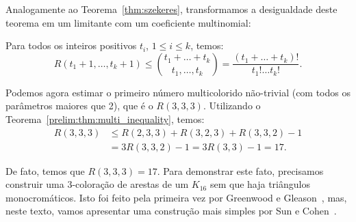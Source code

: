 Analogamente ao Teorema~\ref{thm:szekeres}, transformamos a desigualdade deste teorema em um limitante com um coeficiente multinomial:

\begin{corollary}
\label{prelim:thm:multinomial}
Para todos os inteiros positivos $t_i$, $1 \leq i \leq k$, temos:
\[ R(t_1 + 1, \dots, t_k + 1) \leq \binom{t_1 + \dots + t_k}{t_1, \dots, t_k} =  \frac{(t_1 + \dots + t_k)!}{t_1! \dots t_k!}. \]
\end{corollary}

Podemos agora estimar o primeiro número multicolorido não-trivial (com todos os parâmetros maiores que 2), que é o $R(3,3,3)$. Utilizando o Teorema~\ref{prelim:thm:multi_inequality}, temos:
\begin{align*}
R(3,3,3) &\leq R(2,3,3) + R(3,2,3) + R(3,3,2) - 1 \\
&= 3R(3,3,2) - 1 = 3R(3,3) -1 = 17.
\end{align*}

De fato, temos que $R(3,3,3) = 17$. Para demonstrar este fato, precisamos construir uma 3-coloração de arestas de um $K_{16}$ sem que haja triângulos monocromáticos. Isto foi feito pela primeira vez por Greenwood e Gleason~\cite{greenwood}, mas, neste texto, vamos apresentar uma construção mais simples por Sun e Cohen~\cite{sun}.

